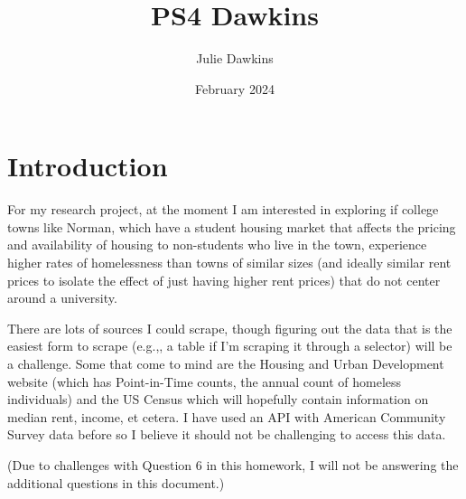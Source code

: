 \documentclass{article}
\title{PS4 Dawkins}
\author{Julie Dawkins}
\date{February 2024}
\begin{document}
\maketitle

\section{Introduction}
For my research project, at the moment I am interested in exploring if college towns like Norman, which have a student housing market that affects the pricing and availability of housing to non-students who live in the town, experience higher rates of homelessness than towns of similar sizes (and ideally similar rent prices to isolate the effect of just having higher rent prices) that do not center around a university.

There are lots of sources I could scrape, though figuring out the data that is the easiest form to scrape (e.g.,, a table if I'm scraping it through a selector) will be a challenge. Some that come to mind are the Housing and Urban Development website (which has Point-in-Time counts, the annual count of homeless individuals) and the US Census which will hopefully contain information on median rent, income, et cetera. I have used an API with American Community Survey data before so I believe it should not be challenging to access this data. 

(Due to challenges with Question 6 in this homework, I will not be answering the additional questions in this document.)
\end{document}
